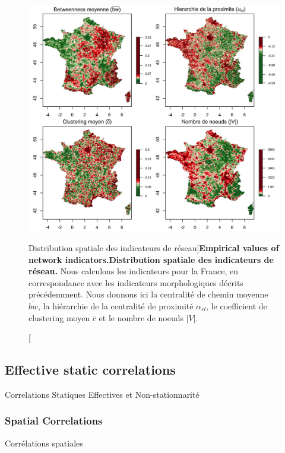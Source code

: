 \begin{figure}
\includegraphics[width=\linewidth]{Figures/Final/4-1-2-fig-staticcorrs-network}
\caption[Empirical values of network indicators][Distribution spatiale des indicateurs de réseau]{\textbf{Empirical values of network indicators.}\label{fig:staticcorrs:network}}{\textbf{Distribution spatiale des indicateurs de réseau.} Nous calculons les indicateurs pour la France, en correspondance avec les indicateurs morphologiques décrits précédemment. Nous donnons ici la centralité de chemin moyenne $\bar{bw}$, la hiérarchie de la centralité de proximité $\alpha_{cl}$, le coefficient de clustering moyen $\bar{c}$ et le nombre de noeuds $\left|V\right|$.\label{fig:staticcorrs:network}}
\end{figure}




\subsection{Effective static correlations}{Correlations Statiques Effectives et Non-stationnarité}



\subsubsection{Spatial Correlations}{Corrélations spatiales}


